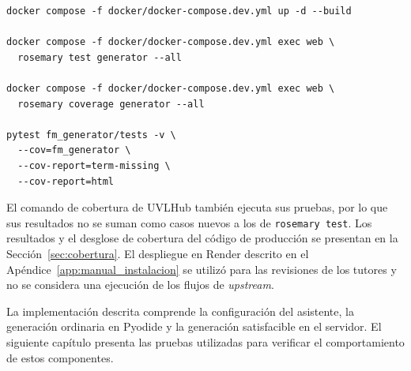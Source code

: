 \begin{verbatim}
docker compose -f docker/docker-compose.dev.yml up -d --build

docker compose -f docker/docker-compose.dev.yml exec web \
  rosemary test generator --all

docker compose -f docker/docker-compose.dev.yml exec web \
  rosemary coverage generator --all

pytest fm_generator/tests -v \
  --cov=fm_generator \
  --cov-report=term-missing \
  --cov-report=html
\end{verbatim}

El comando de cobertura de UVLHub también ejecuta sus pruebas, por lo que
sus resultados no se suman como casos nuevos a los de
\texttt{rosemary test}. Los resultados y el desglose de cobertura del
código de producción se presentan en la Sección~\ref{sec:cobertura}.
El despliegue en Render descrito en el
Apéndice~\ref{app:manual_instalacion} se utilizó para las revisiones de los
tutores y no se considera una ejecución de los flujos de
\textit{upstream}.

La implementación descrita comprende la configuración del asistente, la
generación ordinaria en Pyodide y la generación satisfacible en el servidor.
El siguiente capítulo presenta las pruebas utilizadas para verificar el
comportamiento de estos componentes.
